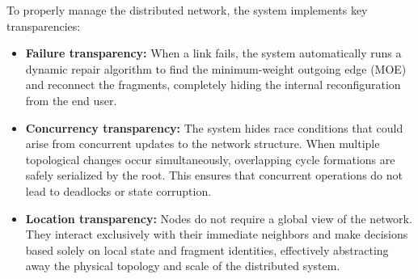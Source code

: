 To properly manage the distributed network, the system implements key transparencies:

\begin{itemize}
    \item \textbf{Failure transparency:} When a link fails, the system automatically runs a dynamic repair algorithm to find the minimum-weight outgoing edge (MOE) and reconnect the fragments, completely hiding the internal reconfiguration from the end user.
    \item \textbf{Concurrency transparency:} The system hides race conditions that could arise from concurrent updates to the network structure. When multiple topological changes occur simultaneously, overlapping cycle formations are safely serialized by the root. This ensures that concurrent operations do not lead to deadlocks or state corruption.
    \item \textbf{Location transparency:} Nodes do not require a global view of the network. They interact exclusively with their immediate neighbors and make decisions based solely on local state and fragment identities, effectively abstracting away the physical topology and scale of the distributed system.
\end{itemize}

